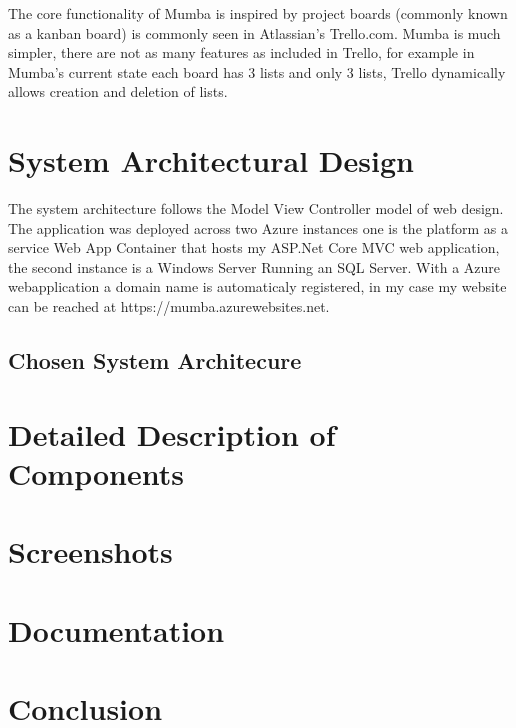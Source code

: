 \documentclass[letterpaper]{article}
\begin{document}
The core functionality of Mumba is inspired by project boards (commonly known as  a kanban board) is commonly seen in Atlassian's Trello.com. Mumba is much simpler, there are not as many features as included in Trello, for example in Mumba's current state each board has 3 lists and only 3 lists, Trello dynamically allows creation and deletion of lists.

\section{System Architectural Design}

The system architecture follows the Model View Controller model of web design. The application was deployed across two Azure instances one is the platform as a service Web App Container that hosts my ASP.Net Core MVC web application, the second instance is a Windows Server Running an SQL Server. With a Azure webapplication a domain name is automaticaly registered, in my case my website can be reached at https://mumba.azurewebsites.net.


\subsection{Chosen System Architecure}

\section{Detailed Description of Components}

\section{Screenshots}

\section{Documentation}

\section{Conclusion}
\end{document}
